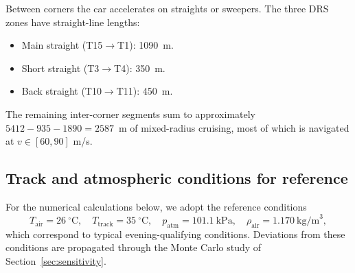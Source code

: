 \documentclass[11pt,twocolumn]{article}
\theoremstyle{definition}
\theoremstyle{remark}
\begin{document}
Between corners the car accelerates on straights or sweepers. The three DRS
zones have straight-line lengths:
\begin{itemize}
  \item Main straight (T15$\to$T1): 1090~m.
  \item Short straight (T3$\to$T4): 350~m.
  \item Back straight (T10$\to$T11): 450~m.
\end{itemize}
The remaining inter-corner segments sum to approximately $5412 - 935 - 1890 =
2587$~m of mixed-radius cruising, most of which is navigated at $v\in[60, 90]$
m/s.

\subsection{Track and atmospheric conditions for reference}

For the numerical calculations below, we adopt the reference conditions
\[
  T_{\mathrm{air}} = 26~^{\circ}\mathrm{C},\quad
  T_{\mathrm{track}} = 35~^{\circ}\mathrm{C},\quad
  p_{\mathrm{atm}} = 101.1~\mathrm{kPa},\quad
  \rho_{\mathrm{air}} = 1.170~\mathrm{kg/m}^3,
\]
which correspond to typical evening-qualifying conditions. Deviations from
these conditions are propagated through the Monte Carlo study of
Section~\ref{sec:sensitivity}.
\end{document}
